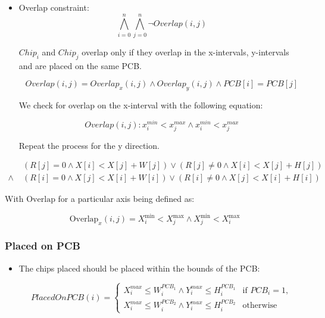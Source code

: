             \begin{itemize}
                \item Overlap constraint:
                    \[
                        \bigwedge_{i=0}^{n}\bigwedge_{j=0}^{n} \lnot Overlap(i, j)
                    \]

                    $Chip_i$ and $Chip_j$ overlap only if they overlap in the
                    x-intervals, y-intervals and are placed on the same PCB.
                    
                    \[  
                        Overlap(i,j) = 
                        Overlap_x(i, j) \land
                        Overlap_y(i, j) \land
                        PCB[i] = PCB[j]
                    \]

                    We check for overlap on the x-interval with the following
                    equation:

                    \[
                        Overlap(i, j) : 
                        x_i^{min} < x_j^{max} \land x_i^{min} < x_j^{max}
                    \]
                    
                    Repeat the process for the y direction.

            \end{itemize}

            $$
            \begin{aligned}
                & (R[j] = 0 \land X[i] < X[j] + W[j]) \lor (R[j] \neq 0 \land
                X[i] < X[j] + H[j]) \\
                \land \;& (R[i] = 0 \land 
                X[j] < X[i] + W[i]) \lor (R[i] \neq 0 \land X[j] < X[i] + H[i])
            \end{aligned}
            $$

            With $\mathrm{Overlap}$ for a particular axis being defined as:

            $$
            \mathrm{Overlap}_x(i,j) = X^{\mathrm{min}}_i < X^{\mathrm{max}}_j
            \land X^{\mathrm{min}}_j < X^{\mathrm{max}}_i 
            $$

        \subsubsection{Placed on PCB}

            \begin{itemize}
                \item The chips placed should be placed within the bounds of the
                PCB:

                \[
                    PlacedOnPCB(i) = \begin{cases}
                        X_i^{max} \leq W^{PCB_1}_i \land 
                        Y_i^{max} \leq H^{PCB_1}_i & \text{if } PCB_i = 1, \\
                        X_i^{max} \leq W^{PCB_2}_i \land
                        Y_i^{max} \leq H^{PCB_2}_i & \text{otherwise}
                    \end{cases}
                \]
            \end{itemize}

